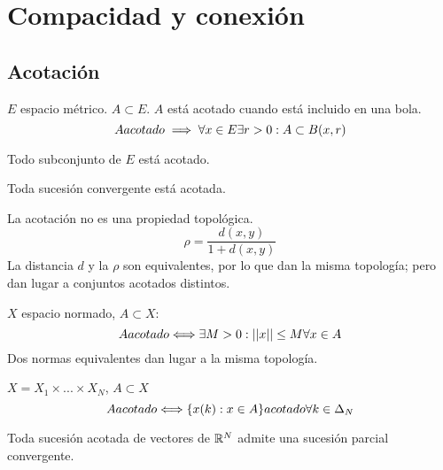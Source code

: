 \chapter{Compacidad y conexión}
\section{Acotación}

\begin{definicion}
    $E$ espacio métrico. $A \subset E$.
    $A$ está acotado cuando está incluido en una bola.
    $$A\\ acotado \implies \forall x \in E \\ \exists r > 0 : A \subset B(x,r)$$
\end{definicion}

\begin{ejemplo}
    Todo subconjunto de $E$ está acotado.
\end{ejemplo}

\begin{ejemplo}
    Toda sucesión convergente está acotada.
\end{ejemplo}

\noindent
La acotación no es una propiedad topológica. 
$$\rho = \frac{d(x,y)}{1+d(x,y)}$$
La distancia $d$ y la $\rho$ son equivalentes, por lo que dan la misma topología; pero dan lugar a conjuntos acotados distintos.

\begin{prop}
    $X$ espacio normado, $A \subset X$:
    $$A \\ acotado \Longleftrightarrow \exists M > 0 : ||x|| \leq M \\ \forall x \in A$$
    Dos normas equivalentes dan lugar a la misma topología.
\end{prop}

\begin{prop}
    $X = X_1 \times ... \times X_N$, $A \subset X$
    $$A \\ acotado \\\Longleftrightarrow \\\{x(k): x \in A\} \\ acotado \\ \forall k \in \Delta_N$$
\end{prop}

\begin{teo}
    Toda sucesión acotada de vectores de $\mathbb R^N$ admite una sucesión parcial convergente.
\end{teo}

